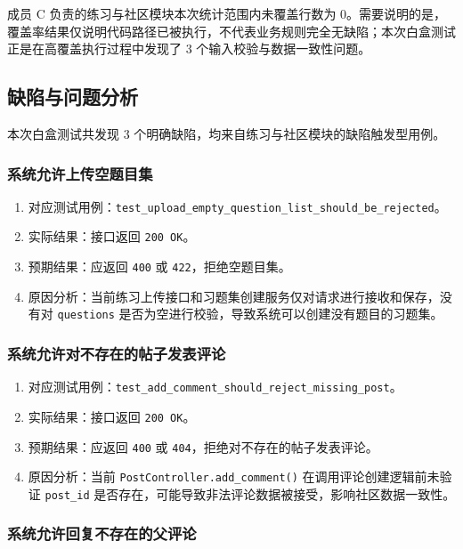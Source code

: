 \documentclass[12pt,a4paper]{ctexart}
\begin{document}
成员 C 负责的练习与社区模块本次统计范围内未覆盖行数为 0。需要说明的是，覆盖率结果仅说明代码路径已被执行，不代表业务规则完全无缺陷；本次白盒测试正是在高覆盖执行过程中发现了 3 个输入校验与数据一致性问题。

\subsection{缺陷与问题分析}

本次白盒测试共发现 3 个明确缺陷，均来自练习与社区模块的缺陷触发型用例。

\subsubsection{系统允许上传空题目集}

\begin{enumerate}
  \item 对应测试用例：\texttt{test\_upload\_empty\_question\_list\_should\_be\_rejected}。
  \item 实际结果：接口返回 \texttt{200 OK}。
  \item 预期结果：应返回 \texttt{400} 或 \texttt{422}，拒绝空题目集。
  \item 原因分析：当前练习上传接口和习题集创建服务仅对请求进行接收和保存，没有对 \texttt{questions} 是否为空进行校验，导致系统可以创建没有题目的习题集。
\end{enumerate}

\subsubsection{系统允许对不存在的帖子发表评论}

\begin{enumerate}
  \item 对应测试用例：\texttt{test\_add\_comment\_should\_reject\_missing\_post}。
  \item 实际结果：接口返回 \texttt{200 OK}。
  \item 预期结果：应返回 \texttt{400} 或 \texttt{404}，拒绝对不存在的帖子发表评论。
  \item 原因分析：当前 \texttt{PostController.add\_comment()} 在调用评论创建逻辑前未验证 \texttt{post\_id} 是否存在，可能导致非法评论数据被接受，影响社区数据一致性。
\end{enumerate}

\subsubsection{系统允许回复不存在的父评论}
\end{document}
